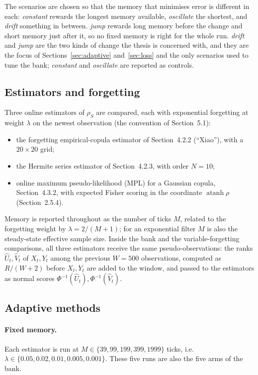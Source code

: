 The scenarios are chosen so that the memory that minimises error is different in each:
\emph{constant} rewards the longest memory available, \emph{oscillate} the shortest, and
\emph{drift} something in between. \emph{jump} rewards long memory before the change and short
memory just after it, so no fixed memory is right for the whole run. \emph{drift} and \emph{jump}
are the two kinds of change the thesis is concerned with, and they are the focus of
Sections~\ref{sec:adaptive} and~\ref{sec:loss} and the only scenarios used to tune the bank;
\emph{constant} and \emph{oscillate} are reported as controls.

\subsection{Estimators and forgetting}
\label{sec:estimators}

Three online estimators of $\rho_S$ are compared, each with exponential forgetting at weight
$\lambda$ on the newest observation (the convention of Section~5.1):
\begin{itemize}
  \item the forgetting empirical-copula estimator of Section~4.2.2 (``Xiao''), with a
    $20\times20$ grid;
  \item the Hermite series estimator of Section~4.2.3, with order $N=10$;
  \item online maximum pseudo-likelihood (MPL) for a Gaussian copula, Section~4.3.2, with
    expected Fisher scoring in the coordinate $\operatorname{atanh}\rho$ (Section~2.5.4).
\end{itemize}
Memory is reported throughout as the number of ticks $M$, related to the forgetting weight by
$\lambda=2/(M+1)$; for an exponential filter $M$ is also the steady-state effective sample size.
Inside the bank and the variable-forgetting comparisons, all three estimators receive the same
pseudo-observations: the ranks $\hat U_t,\hat V_t$ of $X_t,Y_t$ among the previous $W=500$
observations, computed as $R/(W+2)$ before $X_t,Y_t$ are added to the window, and passed to the
estimators as normal scores $\Phi^{-1}(\hat U_t),\Phi^{-1}(\hat V_t)$.

\subsection{Adaptive methods}
\label{sec:methods}

\paragraph{Fixed memory.} Each estimator is run at $M\in\{39,99,199,399,1999\}$ ticks, i.e.\
$\lambda\in\{0.05,0.02,0.01,0.005,0.001\}$. These five runs are also the five arms of the bank.

